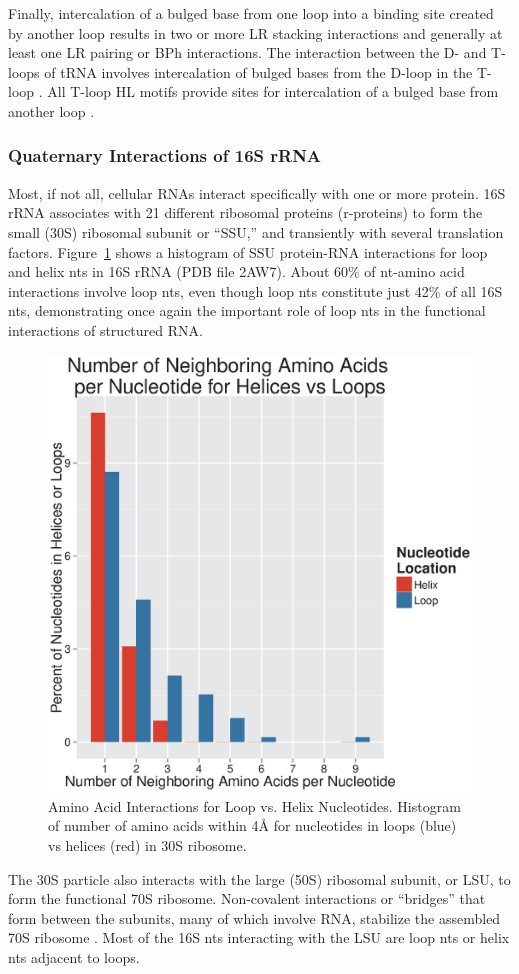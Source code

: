 Finally, intercalation of a bulged base from one loop into a binding site
created by another loop results in two or more LR stacking interactions and
generally at least one LR pairing or BPh interactions. The interaction between
the D- and T-loops of tRNA involves intercalation of bulged bases from the
D-loop in the T-loop \cite{Quigley1976}. All T-loop HL motifs provide sites for
intercalation of a bulged base from another loop \cite{Nagaswamy2002}. 

\subsubsection{Quaternary Interactions of 16S rRNA}

Most, if not all, cellular RNAs interact specifically with one or more protein.
\EC{} 16S rRNA associates with 21 different ribosomal proteins (r-proteins) to
form the small (30S) ribosomal subunit or ``SSU,'' and transiently with several
translation factors. Figure~\ref{fig:aa-loop-v-nt} shows a histogram of SSU
protein-RNA interactions for loop and helix nts in 16S rRNA (PDB file 2AW7).
About 60\% of nt-amino acid interactions involve loop nts, even though loop nts
constitute just 42\% of all 16S nts, demonstrating once again the important role
of loop nts in the functional interactions of structured RNA.

\begin{figure}
  \includegraphics[width=0.5\linewidth]{chapter-1/figs/aa-loop-v-nt}
  \caption{Amino Acid Interactions for Loop vs. Helix Nucleotides. Histogram of
    number of amino acids within 4Å for nucleotides in loops (blue) vs helices
    (red) in \EC{} 30S ribosome. }
  \label{fig:aa-loop-v-nt}
\end{figure}

The 30S particle also interacts with the large (50S) ribosomal subunit, or LSU,
to form the functional 70S ribosome. Non-covalent interactions or ``bridges''
that form between the subunits, many of which involve RNA, stabilize the
assembled 70S ribosome \cite{Yusupov2001}. Most of the 16S nts interacting with
the LSU are loop nts or helix nts adjacent to loops. 

